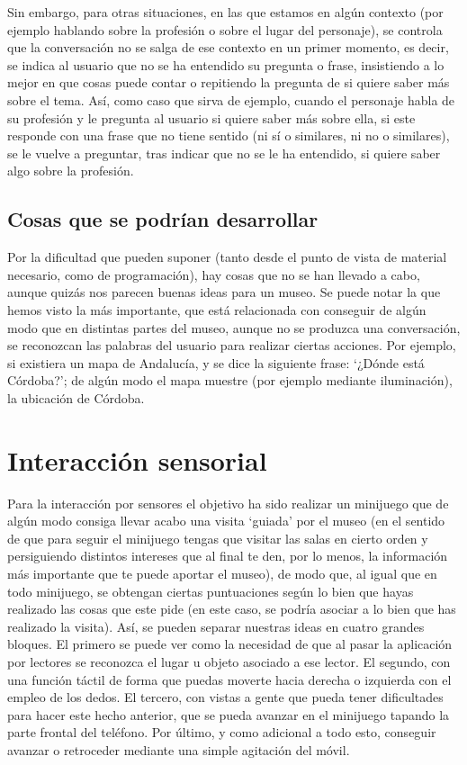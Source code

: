 Sin embargo, para otras situaciones, en las que estamos en algún contexto (por ejemplo hablando sobre la profesión o sobre el lugar del personaje), se controla que la conversación no se salga de ese contexto en un primer momento, es decir, se indica al usuario que no se ha entendido su pregunta o  frase, insistiendo a lo mejor en que cosas puede contar o repitiendo la pregunta de si quiere saber más sobre el tema. Así, como caso que sirva de ejemplo, cuando el personaje habla de su profesión y le pregunta al usuario si quiere saber más sobre ella, si este responde con una frase que no tiene sentido (ni sí o similares, ni no o similares), se le vuelve a preguntar, tras indicar que no se le ha entendido, si quiere saber algo sobre la profesión.\\

\subsection*{Cosas que se podrían desarrollar}

Por la dificultad que pueden suponer (tanto desde el punto de vista de material necesario, como de programación), hay cosas que no se han llevado a cabo, aunque quizás nos parecen buenas ideas para un museo. Se puede notar la que hemos visto la más importante, que está relacionada con conseguir de algún modo que en distintas partes del museo, aunque no se produzca una conversación, se reconozcan las palabras del usuario para realizar ciertas acciones. Por ejemplo, si existiera un mapa de Andalucía, y se dice la siguiente frase: `¿Dónde está Córdoba?'; de algún modo el mapa muestre (por ejemplo mediante iluminación), la ubicación de Córdoba. 

\section{Interacción sensorial}

Para la interacción por sensores el objetivo ha sido realizar un minijuego que de algún modo consiga llevar acabo una visita `guiada' por el museo (en el sentido de que para seguir el minijuego tengas que visitar las salas en cierto orden y persiguiendo distintos intereses que al final te den, por lo menos, la información más importante que te puede aportar el museo), de modo que, al igual que en todo minijuego, se obtengan ciertas puntuaciones según lo bien que hayas realizado las cosas que este pide (en este caso, se podría asociar a lo bien que has realizado la visita). Así, se pueden separar nuestras ideas en cuatro grandes bloques. El primero se puede ver como la necesidad de que al pasar la aplicación por lectores se reconozca el lugar u objeto asociado a ese lector. El segundo, con una función táctil de forma que puedas moverte hacia derecha o izquierda con el empleo de los dedos. El tercero, con vistas a gente que pueda tener dificultades para hacer este hecho anterior, que se pueda avanzar en el minijuego tapando la parte frontal del teléfono. Por último, y como adicional a todo esto, conseguir avanzar o retroceder mediante una simple agitación del móvil.

